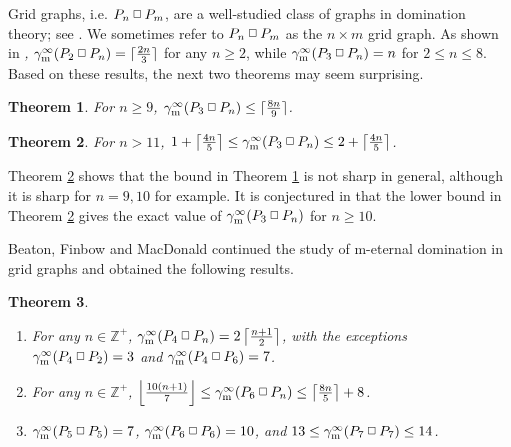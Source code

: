 \documentclass[12pt]{article}%
\newtheorem{theorem}{Theorem}[section]
\providecommand{\boksie}{\ensuremath{\mathbin{\raisebox{0.3mm}{$\scriptstyle\square$}}}}
\begin{document}
Grid graphs, i.e. $P_{n}\boksie P_{m}$, are a well-studied class of graphs in
domination theory; see \cite{HHS}. We sometimes refer to $P_{n}\boksie P_{m}$
as the $n\times m$ grid graph. As shown in \cite{GK2}\emph{,} $\gamma
_{\mathrm{m}}^{\infty}(P_{2}\boksie P_{n})=\lceil\frac{2n}{3}\rceil$ for any
$n\geq2$, while $\gamma_{\mathrm{m}}^{\infty}(P_{3}\boksie P_{n})=n$ for
$2\leq n\leq8$. Based on these results, the next two theorems may seem surprising.

\begin{theorem}
\emph{\cite{GK2}} \label{threeby} For $n\geq9$, $\gamma_{\mathrm{m}}^{\infty
}(P_{3}\boksie P_{n})\leq\lceil\frac{8n}{9}\rceil$.
\end{theorem}

\begin{theorem}
\label{3-grid}\emph{\cite{FMV}} For $n>11$, $1+\left\lceil \frac{4n}%
{5}\right\rceil \leq\gamma_{\mathrm{m}}^{\infty}(P_{3}\boksie P_{n}%
)\leq2+\left\lceil \frac{4n}{5}\right\rceil $.
\end{theorem}

Theorem \ref{3-grid} shows that the bound in Theorem \ref{threeby} is not
sharp in general, although it is sharp for $n=9, 10$ for example. It is
conjectured in \cite{GK2} that the lower bound in Theorem\emph{ }\ref{3-grid}
gives the exact value of $\gamma_{\mathrm{m}}^{\infty}(P_{3}\boksie P_{n})$
for $n\geq10$.

Beaton, Finbow and MacDonald \cite{BFM, BFM2} continued the study of m-eternal
domination in grid graphs and obtained the following results.

\begin{theorem}
\emph{\cite{BFM, BFM2}}\ 

\begin{enumerate}
\item[\emph{(a)}] For any $n\in\mathbb{Z}^{+}$, $\gamma_{\mathrm{m}}^{\infty
}(P_{4}\boksie P_{n})=2\left\lceil \frac{n+1}{2}\right\rceil $, with the
exceptions $\gamma_{\mathrm{m}}^{\infty}(P_{4}\boksie P_{2})=3$ and
$\gamma_{\mathrm{m}}^{\infty}(P_{4}\boksie P_{6})=7$.

\item[\emph{(b)}] For any $n\in\mathbb{Z}^{+}$, $\left\lfloor \frac
{10(n+1)}{7}\right\rfloor \leq\gamma_{\mathrm{m}}^{\infty}(P_{6}\boksie
P_{n})\leq\left\lceil \frac{8n}{5}\right\rceil +8$.

\item[\emph{(c)}] $\gamma_{\mathrm{m}}^{\infty}(P_{5}\boksie P_{5})=7$,
$\gamma_{\mathrm{m}}^{\infty}(P_{6}\boksie P_{6})=10$, and $13\leq
\gamma_{\mathrm{m}}^{\infty}(P_{7}\boksie P_{7})\leq14$.
\end{enumerate}
\end{theorem}
\end{document}
